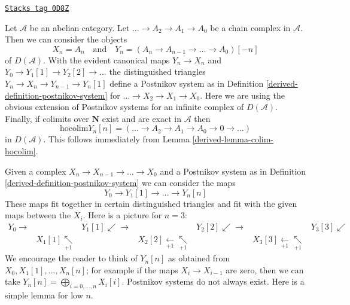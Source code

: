 \begin{example}
\label{derived-example-key-postnikov}
\href{https://stacks.math.columbia.edu/tag/0D8Z}{\texttt{Stacks tag 0D8Z}}

Let $\mathcal{A}$ be an abelian category. Let $\ldots \to A_2 \to A_1 \to A_0$
be a chain complex in $\mathcal{A}$.
Then we can consider the objects
$$
X_n = A_n
\quad\text{and}\quad
Y_n = (A_n \to A_{n - 1} \to \ldots \to A_0)[-n]
$$
of $D(\mathcal{A})$. With the evident canonical maps $Y_n \to X_n$ and
$Y_0 \to Y_1[1] \to Y_2[2] \to \ldots$ the distinguished triangles
$Y_n \to X_n \to Y_{n - 1} \to Y_n[1]$ define a Postnikov system as in
Definition \ref{derived-definition-postnikov-system} for
$\ldots \to X_2 \to X_1 \to X_0$. Here we are using the obvious
extension of Postnikov systems for an infinite complex of $D(\mathcal{A})$.
Finally, if colimits over $\mathbf{N}$ exist and are exact in $\mathcal{A}$
then
$$
\text{hocolim} Y_n[n] = (\ldots \to A_2 \to A_1 \to A_0 \to 0 \to \ldots)
$$
in $D(\mathcal{A})$. This follows immediately from
Lemma \ref{derived-lemma-colim-hocolim}.
\end{example}

Given a complex $X_n \to X_{n - 1} \to \ldots \to X_0$ and a Postnikov
system as in Definition \ref{derived-definition-postnikov-system}
we can consider the maps
$$
Y_0 \to Y_1[1] \to \ldots \to Y_n[n]
$$
These maps fit together in certain distinguished triangles
and fit with the given maps between the $X_i$. Here is a
picture for $n = 3$:
$$
\begin{array}{ccccccc}Y_0 \longrightarrow &  & Y_1[1] \swarrow\longrightarrow &  & Y_2[2] \swarrow\longrightarrow &  & Y_3[3] \swarrow \\  & X_1[1] \underset{+1}{\nwarrow} &  & X_2[2] \underset{+1}{\longleftarrow}\underset{+1}{\nwarrow} &  & X_3[3] \underset{+1}{\longleftarrow}\underset{+1}{\nwarrow} & \end{array}
$$
We encourage the reader to think of $Y_n[n]$ as obtained from
$X_0, X_1[1], \ldots, X_n[n]$; for example if the maps
$X_i \to X_{i - 1}$ are zero, then we can take
$Y_n[n] = \bigoplus_{i = 0, \ldots, n} X_i[i]$.
Postnikov systems do not always exist.
Here is a simple lemma for low $n$.

